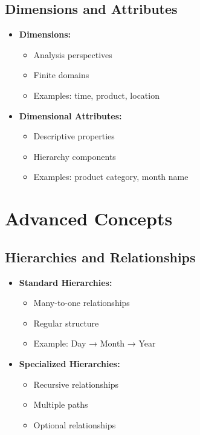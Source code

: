 \subsection{Dimensions and Attributes}
\begin{itemize}
    \item \textbf{Dimensions:}
        \begin{itemize}
            \item Analysis perspectives
            \item Finite domains
            \item Examples: time, product, location
        \end{itemize}
    \item \textbf{Dimensional Attributes:}
        \begin{itemize}
            \item Descriptive properties
            \item Hierarchy components
            \item Examples: product category, month name
        \end{itemize}
\end{itemize}

\section{Advanced Concepts}

\subsection{Hierarchies and Relationships}
\begin{itemize}
    \item \textbf{Standard Hierarchies:}
        \begin{itemize}
            \item Many-to-one relationships
            \item Regular structure
            \item Example: Day → Month → Year
        \end{itemize}
    \item \textbf{Specialized Hierarchies:}
        \begin{itemize}
            \item Recursive relationships
            \item Multiple paths
            \item Optional relationships
        \end{itemize}
\end{itemize}

